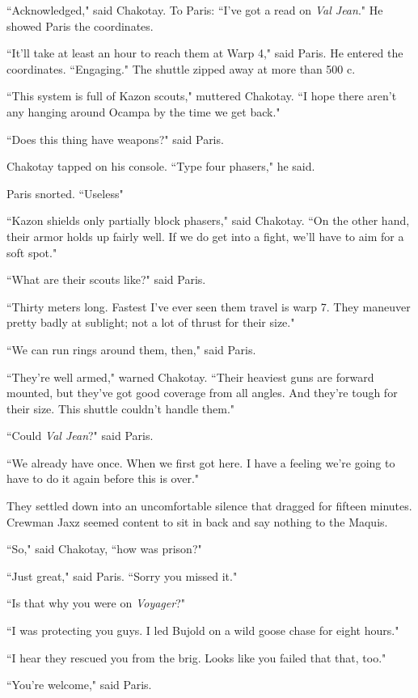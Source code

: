 \documentclass[twoside,letterpaper,12pt]{memoir}
\begin{document}
``Acknowledged," said Chakotay. To Paris: ``I've got a read on \textit{Val Jean}." He showed Paris the coordinates.

``It'll take at least an hour to reach them at Warp 4," said Paris. He entered the coordinates. ``Engaging." The shuttle zipped away at more than 500 c.

``This system is full of Kazon scouts," muttered Chakotay. ``I hope there aren't any hanging around Ocampa by the time we get back."

``Does this thing have weapons?" said Paris.

Chakotay tapped on his console. ``Type four phasers," he said.

Paris snorted. ``Useless"

``Kazon shields only partially block phasers," said Chakotay. ``On the other hand, their armor holds up fairly well. If we do get into a fight, we'll have to aim for a soft spot."

``What are their scouts like?" said Paris.

``Thirty meters long. Fastest I've ever seen them travel is warp 7. They maneuver pretty badly at sublight; not a lot of thrust for their size."

``We can run rings around them, then," said Paris.

``They're well armed," warned Chakotay. ``Their heaviest guns are forward mounted, but they've got good coverage from all angles. And they're tough for their size. This shuttle couldn't handle them."

``Could \textit{Val Jean}?" said Paris.

``We already have once. When we first got here. I have a feeling we're going to have to do it again before this is over."

They settled down into an uncomfortable silence that dragged for fifteen minutes. Crewman Jaxz seemed content to sit in back and say nothing to the Maquis.

``So," said Chakotay, ``how was prison?"

``Just great," said Paris. ``Sorry you missed it."

``Is that why you were on \textit{Voyager}?"

``I was protecting you guys. I led Bujold on a wild goose chase for eight hours."

``I hear they rescued you from the brig. Looks like you failed that that, too."

``You're welcome," said Paris.
\end{document}
